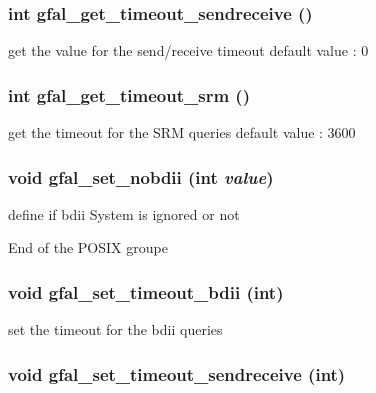 \subsubsection{\setlength{\rightskip}{0pt plus 5cm}int gfal\_\-get\_\-timeout\_\-sendreceive ()}\label{group__common__group_g198564ca7617a8f3dec7c6b925b2c760}


get the value for the send/receive timeout default value : 0 
\subsubsection{\setlength{\rightskip}{0pt plus 5cm}int gfal\_\-get\_\-timeout\_\-srm ()}\label{group__common__group_g31f524748949fca765e6fb8aa20ef41c}


get the timeout for the SRM queries default value : 3600 
\subsubsection{\setlength{\rightskip}{0pt plus 5cm}void gfal\_\-set\_\-nobdii (int {\em value})}\label{group__common__group_g267920b468d7578c10aa25469f8cadf7}


define if bdii System is ignored or not 

End of the POSIX groupe 
\subsubsection{\setlength{\rightskip}{0pt plus 5cm}void gfal\_\-set\_\-timeout\_\-bdii (int)}\label{group__common__group_g7fc461515a2cdf649fd516319cb54ea9}


set the timeout for the bdii queries 
\subsubsection{\setlength{\rightskip}{0pt plus 5cm}void gfal\_\-set\_\-timeout\_\-sendreceive (int)}\label{group__common__group_gedd91bb343f17bc2c0ba9db1203f1819}


